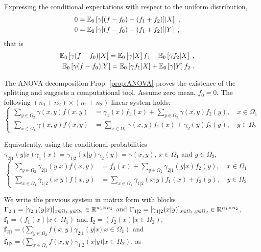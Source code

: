 \documentclass[12pt,a4paper]{amsart}
\begin{document}
Expressing the conditional expectations with respect to the uniform distribution,
%
  \begin{align*}
    0 &= {\operatorname{\mathbb E}}_{0}\left[\gamma[(f-f_0) - (f_1+f_2)] \middle| X\right] \ , \\
   0 &= {\operatorname{\mathbb E}}_{0}\left[\gamma[(f-f_0) - (f_1+f_2)] \middle| Y\right] \ ,
  \end{align*}
that is
%
  \begin{align*}
  {\operatorname{\mathbb E}}_{0}\left[\gamma(f-f_0) \middle| X\right] =  {\operatorname{\mathbb E}}_{0}\left[\gamma \middle| X\right] f_1 + {\operatorname{\mathbb E}}_{0}\left[\gamma f_2 \middle| X\right] \ , \\
    {\operatorname{\mathbb E}}_{0}\left[\gamma(f-f_0) \middle| Y\right] =  {\operatorname{\mathbb E}}_{0}\left[\gamma f_1 \middle| X\right]  + {\operatorname{\mathbb E}}_{0}\left[\gamma \middle| Y\right] f_2\ .
  \end{align*}

The ANOVA decomposition Prop. \ref{prop:ANOVA} proves the existence of the splitting and suggests a computational tool. Assume zero mean, $f_0=0$. The following $(n_1+n_2)\times(n_1+n_2)$ linear system holds:
%
\begin{equation*}
\begin{cases}
  \sum_{y \in \Omega_2} \gamma(x,y)f(x,y) &= \gamma_1(x) f_1(x) + \sum_{y \in \Omega_2} \gamma(x,y) f_2(y) , \quad x \in \Omega_1 \\
  \sum_{x \in \Omega_1} \gamma(x,y)f(x,y) &= \sum_{x \in \Omega_1} \gamma(x,y) f_1(x)  + \gamma_2(y)f_2(y) , \quad y \in \Omega_2
\end{cases}
\end{equation*}
%

Equivalently, using the conditional probabilities $\gamma_{2|1}(y|x) \gamma_1(x) = \gamma_{1|2}(x|y) \gamma_2(y) = \gamma(x,y)$, $x \in \Omega_1$ and $y \in \Omega_2$,
%
\begin{equation*}
\begin{cases}
  \sum_{y \in \Omega_2} \gamma_{2|1}(y|x)f(x,y) &= f_1(x) + \sum_{y \in \Omega_2} \gamma_{2|1}(y|x) f_2(y) , \quad x \in \Omega_1 \\
  \sum_{x \in \Omega_1} \gamma_{1|2}(x|y)f(x,y) &= \sum_{x \in \Omega_1} \gamma_{1|2}(x|y) f_1(x)  + f_2(y) , \quad y \in \Omega_2
\end{cases}
\end{equation*}
%

We write the previous system in matrix form with blocks $\Gamma_{2|1} = [\gamma_{2|1}(y|x)]_{x \in \Omega_1, y \in \Omega_2} \in \mathbb R^{n_1 \times n_2}$ and $\Gamma_{1|2} = [\gamma_{1|2}(x|y)]_{x \in \Omega_1, y \in \Omega_2} \in \mathbb R^{n_1 \times n_2}$, $\bm f_1 = (f_1(x) | x \in \Omega_1)$ and $\bm f_2 = (f_2(x) | x \in \Omega_2)$, $\bm f_{2|1} = (\sum_{y \in \Omega_2} f(x,y)\gamma_{2|1}(y|x) | x \in \Omega_1)$ and $\bm f_{1|2} = (\sum_{x\in\Omega_1} f(x,y)\gamma_{1|2}(x|y) | x \in \Omega_2)$, as 
\end{document}
